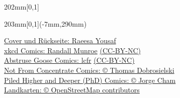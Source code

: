 {\begin{textblock*}{202mm}[0,1]
\begin{flushleft}
        \end{flushleft}
    \end{textblock*}

    \begin{textblock*}{203mm}[0,1](-7mm,290mm)
        \begin{flushright}
            \footnotesize
            \href{https://mathphys.info/}{Cover und Rückseite: Raeesa Yousaf}\\ %
            \href{https://xkcd.com/}{xkcd Comics: Randall Munroe} \href{https://creativecommons.org/licenses/by-nc/2.5/}{(CC-BY-NC)}\\
            \href{https://abstrusegoose.com/}{Abstruse Goose Comics: lcfr} \href{https://creativecommons.org/licenses/by-nc/3.0/us/}{(CC-BY-NC)}\\
            \href{https://nfccomic.com}{Not From Concentrate Comics: \copyright{} Thomas Dobrosielski}\\
            \href{https://www.phdcomics.com/}{Piled Higher and Deeper (PhD) Comics: \copyright{} Jorge Cham}\\
            \href{https://www.openstreetmap.org/}{Landkarten: \copyright{} OpenStreetMap contributors}
        \end{flushright}
    \end{textblock*}
}

\graphicspath{{./bilder/}{./}}



